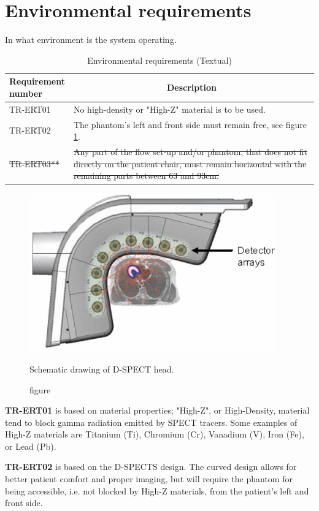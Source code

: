 \section{Environmental requirements}
In what environment is the system operating.
\begin{table} [H]
\caption{Environmental requirements (Textual)}
\label{tab:envirreq_text}
\begin{tabular}{l|p{120mm}|}
	\makecell[l]{\textbf{Requirement} \\ \textbf{number}} & \multicolumn{1}{c}{\textbf{Description}}\\
	\hline
	TR-ERT01 & No high-density or "High-Z" material is to be used.\\ 
	TR-ERT02 & The phantom's left and front side must remain free, see figure \ref{fig:spect_surround}. \\ 
	\sout{TR-ERT03**} & \sout{Any part of the flow set-up and/or phantom, that does not fit directly on the patient chair, must remain horizontal with the remaining parts between 63 and 93cm.} \\
	\cline{2-2}
\end{tabular}
\raggedright

\end{table}

\begin{figure}
  \includegraphics[width=0.5\linewidth]{./images/surrounding_spect.jpg}
  \caption{figure}{Schematic drawing of D-SPECT head\citep{erlandsson2009performance}.}
  \label{fig:spect_surround}
\end{figure}

\textbf{TR-ERT01} is based on material properties; "High-Z", or High-Density, material tend to block gamma radiation emitted by \ac{SPECT} tracers. Some examples of High-Z materials are Titanium (Ti), Chromium (Cr), Vanadium (V), Iron (Fe), or Lead (Pb).

\textbf{TR-ERT02} is based on the D-SPECTS design. The curved design allows for better patient comfort and proper imaging, but will require the phantom for being accessible, i.e. not blocked by High-Z materials, from the patient's left and front side.

